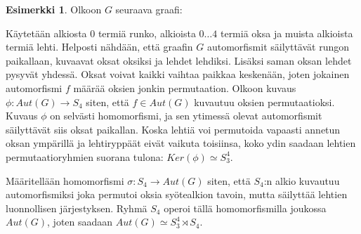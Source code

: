\documentclass[a4paper, 12pt]{article}
\theoremstyle{definition}
\newtheorem{example}[mydef]{Esimerkki}
\theoremstyle{plain}
\begin{document}
\begin{example}
Olkoon $G$ seuraava graafi:

\begin{center}
\end{center}

Käytetään alkiosta $0$ termiä runko, alkioista $0 \dots 4$ termiä oksa ja muista alkioista termiä lehti. Helposti nähdään, että graafin $G$ automorfismit säilyttävät rungon paikallaan, kuvaavat oksat oksiksi ja lehdet lehdiksi. Lisäksi saman oksan lehdet pysyvät yhdessä. Oksat voivat kaikki vaihtaa paikkaa keskenään, joten jokainen automorfismi $f$ määrää oksien jonkin permutaation. 
Olkoon kuvaus $\phi: Aut(G) \rightarrow S_4$ siten, että $f \in Aut(G)$ kuvautuu oksien permutaatioksi. Kuvaus $\phi$ on selvästi homomorfismi, ja sen ytimessä olevat automorfismit säilyttävät siis oksat paikallan. Koska lehtiä voi permutoida vapaasti annetun oksan ympärillä ja lehtiryppäät eivät vaikuta toisiinsa, koko ydin saadaan lehtien permutaatioryhmien suorana tulona: $Ker(\phi) \simeq S_3^4$. 

Määritellään homomorfismi $\sigma: S_4 \rightarrow Aut(G)$ siten, että $S_4$:n alkio kuvautuu automorfismiksi joka permutoi oksia syötealkion tavoin, mutta säilyttää lehtien luonnollisen järjestyksen. Ryhmä $S_4$ operoi tällä homomorfismilla joukossa $Aut(G)$, joten saadaan $Aut(G) \simeq S_3^4 \rtimes S_4$.
\end{example}
\end{document}
